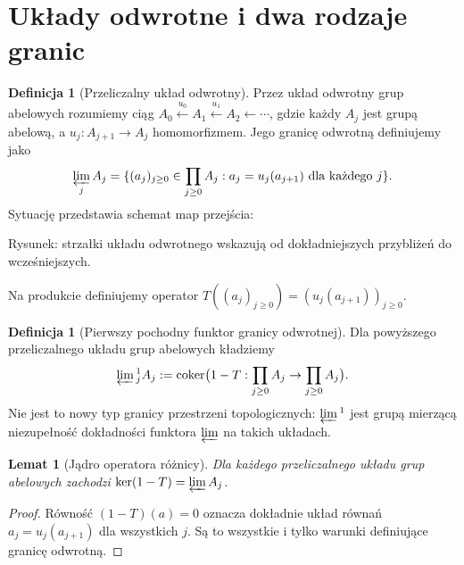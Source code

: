 \documentclass[11pt,a4paper,oneside]{report}
\theoremstyle{plain}
\newtheorem{lemat}[twierdzenie]{Lemat}
\theoremstyle{definition}
\newtheorem{definicja}[twierdzenie]{Definicja}
\theoremstyle{remark}
\begin{document}
\section{Układy odwrotne i dwa rodzaje granic}
\begin{definicja}[Przeliczalny układ odwrotny]
Przez układ odwrotny grup abelowych rozumiemy ciąg
$A_0\xleftarrow{u_0}A_1\xleftarrow{u_1}A_2\leftarrow\cdots$,
gdzie każdy $A_j$ jest grupą abelową, a $u_j:A_{j+1}\to A_j$
homomorfizmem. Jego granicę odwrotną definiujemy jako
\[
\varprojlim_jA_j=
\{(a_j)_{j\ge0}\in\prod_{j\ge0}A_j:
 a_j=u_j(a_{j+1})\text{ dla każdego }j\}.
\]
Sytuację przedstawia schemat map przejścia:
\begin{center}
\par\smallskip\small Rysunek: strzałki układu odwrotnego wskazują od dokładniejszych przybliżeń do wcześniejszych.
\end{center}
Na produkcie definiujemy operator
$T((a_j)_{j\ge0})=(u_j(a_{j+1}))_{j\ge0}$.
\end{definicja}
\begin{definicja}[Pierwszy pochodny funktor granicy odwrotnej]
Dla powyższego przeliczalnego układu grup abelowych kładziemy
\[
\varprojlim{}^1_jA_j:=
\operatorname{coker}\bigl(1-T:\prod_{j\ge0}A_j\to
\prod_{j\ge0}A_j\bigr).
\]
Nie jest to nowy typ granicy przestrzeni topologicznych:
$\varprojlim{}^1$ jest grupą mierzącą niezupełność dokładności
funktora $\varprojlim$ na takich układach.
\end{definicja}
\begin{lemat}[Jądro operatora różnicy]
Dla każdego przeliczalnego układu grup abelowych zachodzi
$\ker(1-T)=\varprojlim A_j$.
\end{lemat}
\begin{proof}
Równość $(1-T)(a)=0$ oznacza dokładnie układ równań
$a_j=u_j(a_{j+1})$ dla wszystkich $j$. Są to wszystkie i tylko
warunki definiujące granicę odwrotną.
\end{proof}
\end{document}
